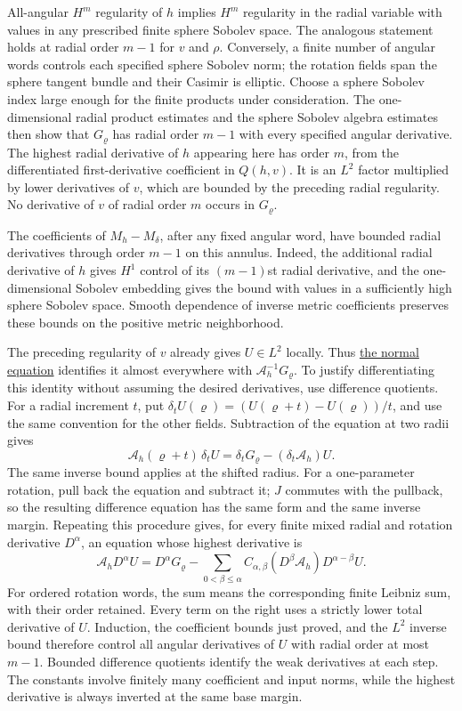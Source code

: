 \documentclass[
  english,
  11pt,
  reqno]{amsart}
\begin{document}
All-angular \(H^m\) regularity of \(h\) implies \(H^m\) regularity in
the radial variable with values in any prescribed finite sphere Sobolev
space. The analogous statement holds at radial order \(m-1\) for \(v\)
and \(\rho\). Conversely, a finite number of angular words controls each
specified sphere Sobolev norm; the rotation fields span the sphere
tangent bundle and their Casimir is elliptic. Choose a sphere Sobolev
index large enough for the finite products under consideration. The
one-dimensional radial product estimates and the sphere Sobolev algebra
estimates then show that \(G_\varrho\) has radial order \(m-1\) with
every specified angular derivative. The highest radial derivative of
\(h\) appearing here has order \(m\), from the differentiated
first-derivative coefficient in \(Q(h,v)\). It is an \(L^2\) factor
multiplied by lower derivatives of \(v\), which are bounded by the
preceding radial regularity. No derivative of \(v\) of radial order
\(m\) occurs in \(G_\varrho\).

The coefficients of \(M_h-M_\delta\), after any fixed angular word, have
bounded radial derivatives through order \(m-1\) on this annulus.
Indeed, the additional radial derivative of \(h\) gives \(H^1\) control
of its \((m-1)\)st radial derivative, and the one-dimensional Sobolev
embedding gives the bound with values in a sufficiently high sphere
Sobolev space. Smooth dependence of inverse metric coefficients
preserves these bounds on the positive metric neighborhood.

The preceding regularity of \(v\) already gives \(U\in L^2\) locally.
Thus \hyperref[eq:online-momentum-invertible-normal-equation]{the normal
equation} identifies it almost everywhere with
\(\mathcal A_h^{-1}G_\varrho\). To justify differentiating this identity
without assuming the desired derivatives, use difference quotients. For
a radial increment \(t\), put
\(\delta_tU(\varrho)=(U(\varrho+t)-U(\varrho))/t\), and use the same
convention for the other fields. Subtraction of the equation at two
radii gives \[
\mathcal A_h(\varrho+t)\,\delta_tU
 =\delta_tG_\varrho-(\delta_t\mathcal A_h)U.
\] The same inverse bound applies at the shifted radius. For a
one-parameter rotation, pull back the equation and subtract it; \(J\)
commutes with the pullback, so the resulting difference equation has the
same form and the same inverse margin. Repeating this procedure gives,
for every finite mixed radial and rotation derivative \(D^\alpha\), an
equation whose highest derivative is%
\[
\mathcal A_hD^\alpha U
 =D^\alpha G_\varrho
  -\sum_{0<\beta\le\alpha}
     C_{\alpha,\beta}
       (D^\beta\mathcal A_h)D^{\alpha-\beta}U.
\] For ordered rotation words, the sum means the corresponding finite
Leibniz sum, with their order retained. Every term on the right uses a
strictly lower total derivative of \(U\). Induction, the coefficient
bounds just proved, and the \(L^2\) inverse bound therefore control all
angular derivatives of \(U\) with radial order at most \(m-1\). Bounded
difference quotients identify the weak derivatives at each step. The
constants involve finitely many coefficient and input norms, while the
highest derivative is always inverted at the same base margin.
\end{document}
